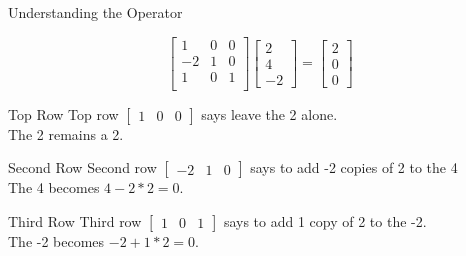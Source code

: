 \documentclass[10pt]{beamer}
\begin{document}

\begin{frame}{Understanding the Operator}
    
     $$\begin{bmatrix}
          1 & 0 & 0\\
        -2 & 1 & 0\\
        1 & 0 & 1\\
        \end{bmatrix} \begin{bmatrix}2 \\ 4 \\ -2\end{bmatrix} =
        \begin{bmatrix}
        2 \\ 0 \\ 0
        \end{bmatrix}$$ 

    \begin{block}{Top Row}
         Top row $\begin{bmatrix}
                1 & 0 & 0
            \end{bmatrix}$ says leave the 2 alone.\\
            The 2 remains a 2.
    \end{block}
    
    \begin{block}{Second Row}
            Second row $\begin{bmatrix}
                -2 & 1 & 0
            \end{bmatrix}$ says to add -2 copies of 2 to the 4\\
            The 4 becomes $4-2*2 = 0$.
    \end{block}

       \begin{block}{Third Row}
            Third row $\begin{bmatrix}
                1 & 0 & 1
            \end{bmatrix}$ says to add 1 copy of 2 to the -2.\\
            The -2 becomes $-2+1*2 = 0$.
    \end{block}
\end{frame}
\end{document}
